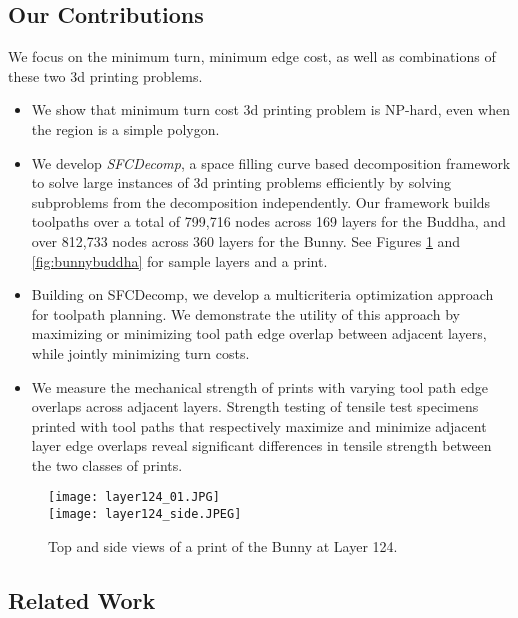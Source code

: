 \subsection{Our Contributions}
  We focus on the minimum turn, minimum edge cost, as well as combinations of these two 3d printing problems.  
  \begin{itemize}
    \item We show that minimum turn cost 3d printing problem is NP-hard, even when the region is a simple polygon.  
    \item We develop \emph{SFCDecomp}, a space filling curve based decomposition framework to solve large instances of 3d printing problems efficiently by solving subproblems from the decomposition independently.
      Our framework builds toolpaths over a total of 799,716 nodes across 169 layers for the Buddha, and over 812,733 nodes across 360 layers for the Bunny.
      See Figures \ref{fig:introimage} and \ref{fig:bunnybuddha} for sample layers and a print.

    \item Building on SFCDecomp, we develop a multicriteria optimization approach for toolpath planning.
      We demonstrate the utility of this approach by maximizing or minimizing tool path edge overlap between adjacent layers, while jointly minimizing turn costs.
    \item We measure the mechanical strength of prints with varying tool path edge overlaps across adjacent layers.
      Strength testing of tensile test specimens printed with tool paths that respectively maximize and minimize adjacent layer edge overlaps reveal significant differences in tensile strength between the two classes of prints.      
  \end{itemize}

\begin{figure}[hbp!] 
  \centering
  \texttt{[image: layer124\_01.JPG]}
  \\
  \bigskip
  \texttt{[image: layer124\_side.JPEG]}
  \caption{\label{fig:introimage} Top and side views of a print of the Bunny at Layer 124.}  	
\end{figure}
  

\subsection{Related Work} \label{sec:previouswork}

